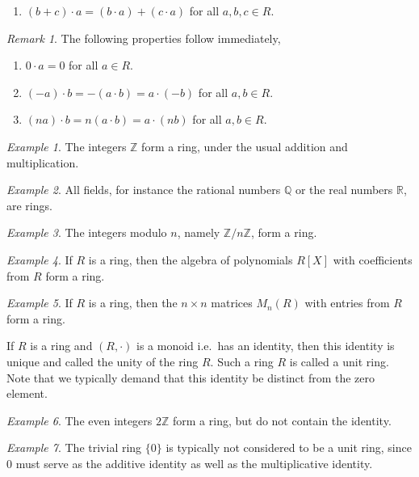 \documentclass[11pt]{article}
\newcommand{\R}{\mathbb{R}}
\newcommand{\Q}{\mathbb{Q}}
\newcommand{\Z}{\mathbb{Z}}
\theoremstyle{definition}
\theoremstyle{remark}
\newtheorem*{remark}{Remark}
\newtheorem*{example}{Example}
\numberwithin{equation}{section}
\begin{document}
\begin{definition}
\begin{enumerate}
\begin{enumerate}
                \item $(b + c)\cdot a = (b\cdot a) + (c\cdot a)$ for all $a, b, c \in R$.
            \end{enumerate}
        \end{enumerate}
        \begin{remark}
            The following properties follow immediately,
            \begin{enumerate}
                \itemsep0em
                \item $0\cdot a = 0$ for all $a \in R$.
                \item $(-a)\cdot b = -(a\cdot b) = a\cdot(-b)$ for all $a, b \in R$.
                \item $(na)\cdot b = n(a\cdot b) = a\cdot (nb)$ for all $a, b \in R$.
            \end{enumerate}
        \end{remark}
    \end{definition}

    \begin{example}
        The integers $\Z$ form a ring, under the usual addition and multiplication.
    \end{example}
    \begin{example}
        All fields, for instance the rational numbers $\Q$ or the real numbers $\R$,
        are rings.
    \end{example}
    \begin{example}
        The integers modulo $n$, namely $\Z/n\Z$, form a ring.
    \end{example}
    \begin{example}
        If $R$ is a ring, then the algebra of polynomials $R[X]$ with coefficients
        from $R$ form a ring.
    \end{example}
    \begin{example}
        If $R$ is a ring, then the $n \times n$ matrices $M_n(R)$ with entries from
        $R$ form a ring.
    \end{example}

    \begin{definition}
        If $R$ is a ring and $(R, \cdot)$ is a monoid i.e.\ has an identity, then
        this identity is unique and called the unity of the ring $R$. Such a ring $R$
        is called a unit ring. Note that we typically demand that this identity be
        distinct from the zero element.
    \end{definition}
    \begin{example}
        The even integers $2\Z$ form a ring, but do not contain the identity.
    \end{example}
    \begin{example}
        The trivial ring $\{0\}$ is typically not considered to be a unit ring, since
        $0$ must serve as the additive identity as well as the multiplicative
        identity.
    \end{example}
\end{document}
